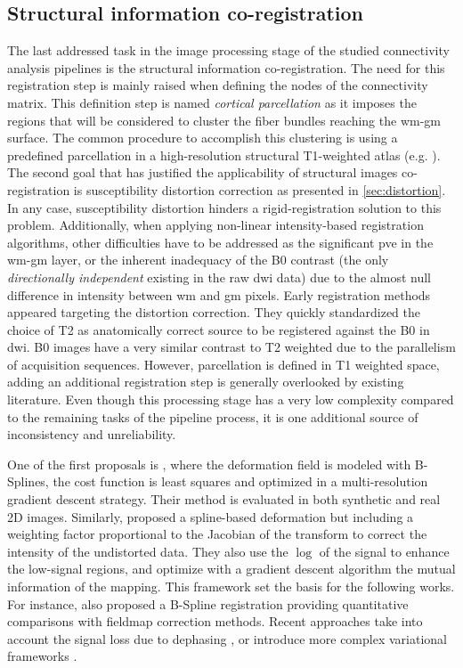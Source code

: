 \subsection{Structural information co-registration}
\label{sec:registration}

The last addressed task in the image processing stage of the studied 
connectivity analysis pipelines is the structural information co-registration.
The need for this registration step is mainly raised when defining the 
nodes of the connectivity matrix. This definition step is named
\textit{cortical parcellation} as it imposes the regions that will be
considered to cluster the fiber bundles reaching the \gls{wm}-\gls{gm}
surface. The common procedure to accomplish this clustering is using
a predefined parcellation in a high-resolution structural T1-weighted 
atlas (e.g. \citep{greve_accurate_2009}). The second goal that has 
justified the applicability of structural
images co-registration is susceptibility distortion correction
as presented in \autoref{sec:distortion}. In any case, susceptibility 
distortion hinders a rigid-registration solution to this problem.
Additionally, when applying non-linear intensity-based
registration algorithms, other difficulties have to be addressed as
the significant \gls{pve} in the \gls{wm}-\gls{gm} layer, or the
inherent inadequacy of the B0 contrast (the only \textit{directionally
independent} existing in the raw \gls{dwi} data) due to the almost null
difference in intensity between \gls{wm} and \gls{gm} pixels. Early 
registration methods appeared targeting the distortion correction.
They quickly standardized the choice of T2 as anatomically correct source
to be registered against the B0 in \gls{dwi}. B0 images have a very similar
contrast to T2 weighted due to the parallelism of acquisition sequences.
However, parcellation is defined in T1 weighted space, adding an additional 
registration step is generally overlooked by existing literature. Even though this
processing stage has a very low complexity compared to the remaining tasks of 
the pipeline process, it is one additional source of inconsistency
and unreliability.


One of the first proposals is \citep{kybic_unwarping_2000}, where the deformation
field is modeled with B-Splines, the cost function is least squares and optimized
in a multi-resolution gradient descent strategy. Their method is evaluated in 
both synthetic and real 2D images. Similarly,
\citep{studholme_accurate_2000} proposed a spline-based deformation but including
a weighting factor proportional to the Jacobian of the transform to correct the
intensity of the undistorted data. They also use the $\log$ of the signal to
enhance the low-signal regions, and optimize with a gradient descent algorithm
the mutual information of the mapping. This framework set the basis for the following
works. For instance, \citep{wu_comparison_2008} also proposed a B-Spline registration
providing quantitative comparisons with fieldmap correction methods. Recent approaches
take into account the signal loss due to dephasing \citep{li_accounting_2007}, or 
introduce more complex variational frameworks \citep{tao_variational_2009}.

